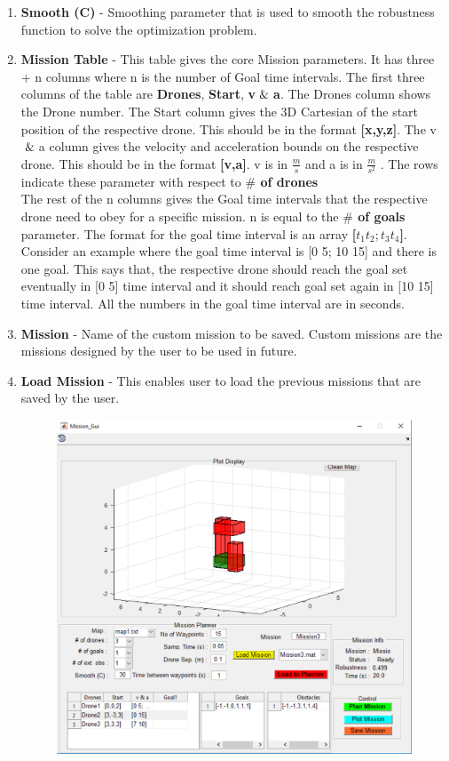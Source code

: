 \documentclass[english]{article}
\begin{document}
\begin{enumerate}
\begin{figure}[H]
    \end{figure}
    \item \textbf{Smooth (C)} - Smoothing parameter that is used to smooth the robustness function to solve the optimization problem.
    \item \textbf{Mission Table} - This table gives the core Mission parameters. It has three + n columns where n is the number of Goal time intervals. The first three columns of the table are \textbf{Drones}, \textbf{Start}, \textbf{v$\And$a}. The Drones column shows the Drone number. The Start column gives the 3D Cartesian of the start position of the respective drone. This should be in the format \textbf{[x,y,z]}. The v$\And$a column gives the velocity and acceleration bounds on the respective drone. This should be in the format \textbf{[v,a]}. v is in $\frac{m}{s}$ and a is in $\frac{m}{s^2}$ . The rows indicate these parameter with respect to \textbf{$\#$ of drones}\\
    The rest of the n columns gives the Goal time intervals that the respective drone need to obey for a specific mission. n is equal to the \textbf{$\#$ of goals} parameter. The format for the goal time interval is an array \textbf{[$t_1 t_2; t_3 t_4$]}. Consider an example where the goal time interval is [0 5; 10 15] and there is one goal. This says that, the respective drone should reach the goal set eventually in [0 5] time interval and it should reach goal set again in [10 15] time interval. All the numbers in the goal time interval are in seconds. 
    \item \textbf{Mission} - Name of the custom mission to be saved. Custom missions are the missions designed by the user to be used in future.
    \item \textbf{Load Mission} - This enables user to load the previous missions that are saved by the user. 
    \begin{figure}[H]
        \centering
        \includegraphics[scale=0.5]{load.pdf}

\end{figure}
\end{enumerate}
\end{document}
